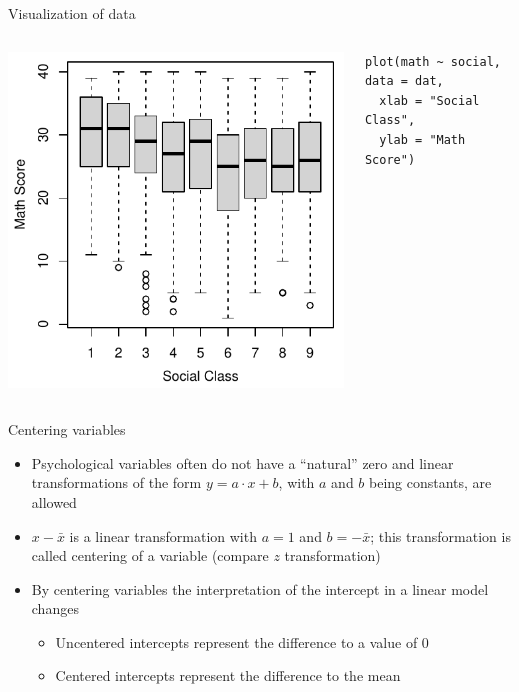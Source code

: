 \documentclass[aspectratio=169]{beamer}
\begin{document}
\begin{frame}[fragile]{Visualization of data}
  \begin{columns}
    \begin{column}{.5\textwidth}
      \includegraphics[scale=.8]{../figures/jsp_box1}
    \end{column}
    \begin{column}{.5\textwidth}
      \begin{lstlisting}
plot(math ~ social, data = dat,
  xlab = "Social Class",
  ylab = "Math Score")
      \end{lstlisting}
    \end{column}
  \end{columns}
\end{frame}

\begin{frame}[fragile]{Centering variables}
  \begin{itemize}
    \item Psychological variables often do not have a ``natural'' zero and
      linear transformations of the form $y = a\cdot x + b$, with $a$ and
      $b$ being constants, are allowed
    \item $x - \bar x$ is a linear transformation with $a = 1$ and $b =
      -\bar x$; this transformation is called centering of a variable
      (compare $z$ transformation)
    \item By centering variables the interpretation of the intercept in a
      linear model changes
    \begin{itemize}
      \item Uncentered intercepts represent the difference to a value of 0
      \item Centered intercepts represent the difference to the mean
    \end{itemize}
  \end{itemize}
\end{frame}
\end{document}
